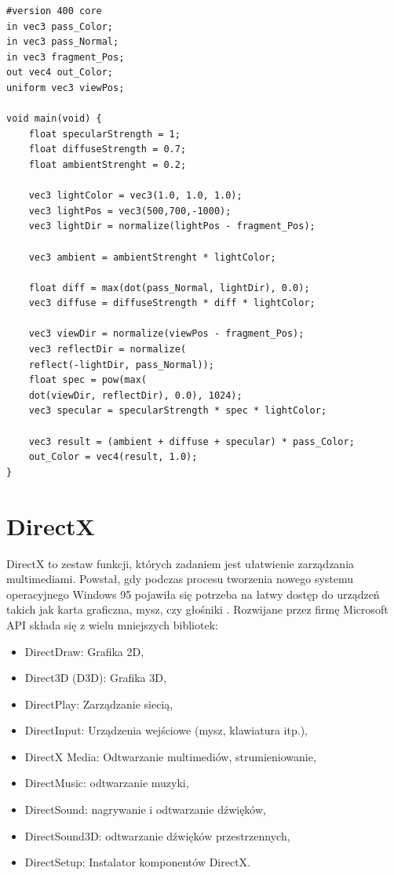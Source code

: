\documentclass[archive]{mgr}
\begin{document}
\begin{lstlisting}[caption={Shader fragmentów, oświetlenie według modelu Phonga},captionpos=b,label={lab:fragmentshader}]
#version 400 core
in vec3 pass_Color;
in vec3 pass_Normal;
in vec3 fragment_Pos;
out vec4 out_Color;
uniform vec3 viewPos;

void main(void) {
	float specularStrength = 1;
	float diffuseStrength = 0.7;
	float ambientStrenght = 0.2;

    vec3 lightColor = vec3(1.0, 1.0, 1.0);
	vec3 lightPos = vec3(500,700,-1000);
	vec3 lightDir = normalize(lightPos - fragment_Pos);

	vec3 ambient = ambientStrenght * lightColor;

	float diff = max(dot(pass_Normal, lightDir), 0.0);
	vec3 diffuse = diffuseStrength * diff * lightColor;

	vec3 viewDir = normalize(viewPos - fragment_Pos);
	vec3 reflectDir = normalize(
	reflect(-lightDir, pass_Normal)); 
	float spec = pow(max(
	dot(viewDir, reflectDir), 0.0), 1024);
	vec3 specular = specularStrength * spec * lightColor; 

	vec3 result = (ambient + diffuse + specular) * pass_Color;
	out_Color = vec4(result, 1.0);
} 
\end{lstlisting}


\newpage



\section{DirectX}

DirectX to zestaw funkcji, których zadaniem jest ułatwienie zarządzania multimediami. Powstał, gdy podczas procesu tworzenia nowego systemu operacyjnego Windows 95 pojawiła się potrzeba na łatwy dostęp do urządzeń takich jak karta graficzna, mysz, czy głośniki \cite{the-history-of-directx}. Rozwijane przez firmę Microsoft API składa się z wielu mniejszych bibliotek:
\begin{itemize}
  \item DirectDraw: Grafika 2D,
  \item Direct3D (D3D): Grafika 3D,
  \item DirectPlay: Zarządzanie siecią,
  \item DirectInput: Urządzenia wejściowe (mysz, klawiatura itp.),
  \item DirectX Media: Odtwarzanie multimediów, strumieniowanie,
  \item DirectMusic: odtwarzanie muzyki,
  \item DirectSound: nagrywanie i odtwarzanie dźwięków,
  \item DirectSound3D: odtwarzanie dźwięków przestrzennych,
  \item DirectSetup: Instalator komponentów DirectX.
\end{itemize}
\end{document}
